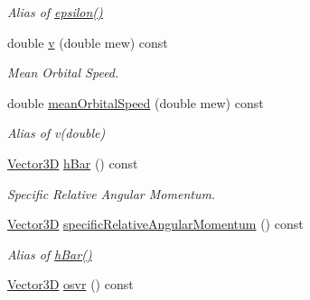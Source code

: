 \begin{DoxyCompactItemize}
\begin{DoxyCompactList}\small\item\em Alias of \hyperlink{class_orbit3_d_ada50a0694411e68f1a51ff62b3b63e91}{epsilon()} \end{DoxyCompactList}\item 
\hypertarget{class_orbit3_d_aaa08afdb560b360dc721626e9a81161e}{double \hyperlink{class_orbit3_d_aaa08afdb560b360dc721626e9a81161e}{v} (double mew) const }\label{class_orbit3_d_aaa08afdb560b360dc721626e9a81161e}

\begin{DoxyCompactList}\small\item\em Mean Orbital Speed. \end{DoxyCompactList}\item 
\hypertarget{class_orbit3_d_aa8e2de96cf1ec1b7695ea884df03a9c7}{double \hyperlink{class_orbit3_d_aa8e2de96cf1ec1b7695ea884df03a9c7}{mean\+Orbital\+Speed} (double mew) const }\label{class_orbit3_d_aa8e2de96cf1ec1b7695ea884df03a9c7}

\begin{DoxyCompactList}\small\item\em Alias of v(double) \end{DoxyCompactList}\item 
\hypertarget{class_orbit3_d_a45a7c59fe4276f2a5bc5343caa7ca5ee}{\hyperlink{class_vector3_d}{Vector3\+D} \hyperlink{class_orbit3_d_a45a7c59fe4276f2a5bc5343caa7ca5ee}{h\+Bar} () const }\label{class_orbit3_d_a45a7c59fe4276f2a5bc5343caa7ca5ee}

\begin{DoxyCompactList}\small\item\em Specific Relative Angular Momentum. \end{DoxyCompactList}\item 
\hypertarget{class_orbit3_d_a24e8d26cbf5723538d62940caae960a0}{\hyperlink{class_vector3_d}{Vector3\+D} \hyperlink{class_orbit3_d_a24e8d26cbf5723538d62940caae960a0}{specific\+Relative\+Angular\+Momentum} () const }\label{class_orbit3_d_a24e8d26cbf5723538d62940caae960a0}

\begin{DoxyCompactList}\small\item\em Alias of \hyperlink{class_orbit3_d_a45a7c59fe4276f2a5bc5343caa7ca5ee}{h\+Bar()} \end{DoxyCompactList}\item 
\hypertarget{class_orbit3_d_ab892cbfb91cf58d6145fcc4457a4ed17}{\hyperlink{class_vector3_d}{Vector3\+D} \hyperlink{class_orbit3_d_ab892cbfb91cf58d6145fcc4457a4ed17}{osvr} () const }\label{class_orbit3_d_ab892cbfb91cf58d6145fcc4457a4ed17}


\end{DoxyCompactItemize}
